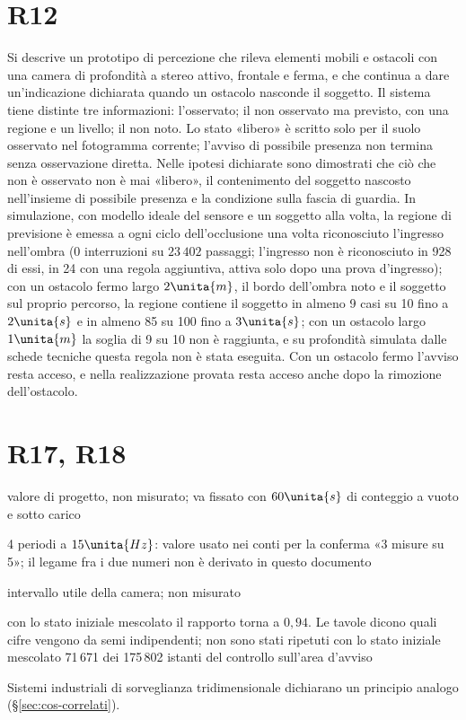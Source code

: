 \section*{R12}
Si descrive un prototipo di percezione che rileva elementi mobili e ostacoli con una camera di profondità a stereo attivo, frontale e ferma, e che continua a dare un'indicazione dichiarata quando un ostacolo nasconde il soggetto. Il sistema tiene distinte tre informazioni: l'osservato; il non osservato ma previsto, con una regione e un livello; il non noto. Lo stato «libero» è scritto solo per il suolo osservato nel fotogramma corrente; l'avviso di possibile presenza non termina senza osservazione diretta. Nelle ipotesi dichiarate sono dimostrati che ciò che non è osservato non è mai «libero», il contenimento del soggetto nascosto nell'insieme di possibile presenza e la condizione sulla fascia di guardia. In simulazione, con modello ideale del sensore e un soggetto alla volta, la regione di previsione è emessa a ogni ciclo dell'occlusione una volta riconosciuto l'ingresso nell'ombra (0 interruzioni su $23\,402$ passaggi; l'ingresso non è riconosciuto in 928 di essi, in 24 con una regola aggiuntiva, attiva solo dopo una prova d'ingresso); con un ostacolo fermo largo $2\unita{m}$, il bordo dell'ombra noto e il soggetto sul proprio percorso, la regione contiene il soggetto in almeno 9 casi su 10 fino a $2\unita{s}$ e in almeno 85 su 100 fino a $3\unita{s}$; con un ostacolo largo $1\unita{m}$ la soglia di 9 su 10 non è raggiunta, e su profondità simulata dalle schede tecniche questa regola non è stata eseguita. Con un ostacolo fermo l'avviso resta acceso, e nella realizzazione provata resta acceso anche dopo la rimozione dell'ostacolo.
\section*{R17, R18}
valore di progetto, non misurato; va fissato con $60\unita{s}$ di conteggio a vuoto e sotto carico

4 periodi a $15\unita{Hz}$: valore usato nei conti per la conferma «3 misure su 5»; il legame fra i due numeri non è derivato in questo documento

intervallo utile della camera; non misurato

con lo stato iniziale mescolato il rapporto torna a $0{,}94$. Le tavole dicono quali cifre vengono da semi indipendenti; non sono stati ripetuti con lo stato iniziale mescolato 71\,671 dei 175\,802 istanti del controllo sull'area d'avviso

Sistemi industriali di sorveglianza tridimensionale dichiarano un principio analogo (\S\ref{sec:cos-correlati}).

